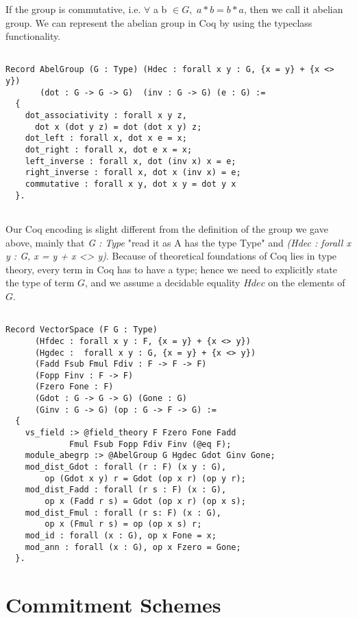     \noindent
    If the group is commutative, i.e. $\forall$ a b $\in  G,$  $a * b = b * a$, then we call it abelian group.  We can represent the abelian group in Coq by using the 
    typeclass functionality. 
 
 
 \begin{verbatim}

Record AbelGroup (G : Type) (Hdec : forall x y : G, {x = y} + {x <> y}) 
       (dot : G -> G -> G)  (inv : G -> G) (e : G) :=
  {
    dot_associativity : forall x y z, 
      dot x (dot y z) = dot (dot x y) z;
    dot_left : forall x, dot x e = x;
    dot_right : forall x, dot e x = x;
    left_inverse : forall x, dot (inv x) x = e;
    right_inverse : forall x, dot x (inv x) = e;
    commutative : forall x y, dot x y = dot y x
  }.
  
\end{verbatim}    

\noindent
Our Coq encoding is slight different from the definition of the group we gave above, mainly that \textit{G : Type} "read it as A has the type Type" and 
\textit{(Hdec : forall x y : G, {x = y} + {x <> y})}. Because of theoretical foundations of Coq lies in type theory, every term in Coq has to have a type;
hence we need to explicitly state the type of term $G$, and we assume a decidable equality $Hdec$ on the elements of $G$.  



\begin{verbatim}

Record VectorSpace (F G : Type)
      (Hfdec : forall x y : F, {x = y} + {x <> y})
      (Hgdec :  forall x y : G, {x = y} + {x <> y})
      (Fadd Fsub Fmul Fdiv : F -> F -> F) 
      (Fopp Finv : F -> F)
      (Fzero Fone : F)
      (Gdot : G -> G -> G) (Gone : G)
      (Ginv : G -> G) (op : G -> F -> G) :=
  {
    vs_field :> @field_theory F Fzero Fone Fadd
             Fmul Fsub Fopp Fdiv Finv (@eq F);
    module_abegrp :> @AbelGroup G Hgdec Gdot Ginv Gone;
    mod_dist_Gdot : forall (r : F) (x y : G),
        op (Gdot x y) r = Gdot (op x r) (op y r);
    mod_dist_Fadd : forall (r s : F) (x : G),
        op x (Fadd r s) = Gdot (op x r) (op x s);
    mod_dist_Fmul : forall (r s: F) (x : G),
        op x (Fmul r s) = op (op x s) r;
    mod_id : forall (x : G), op x Fone = x;
    mod_ann : forall (x : G), op x Fzero = Gone;
  }.
\end{verbatim}

\section{Commitment Schemes}


